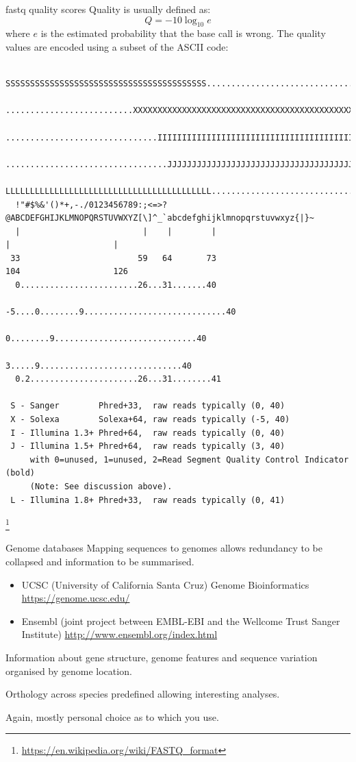 \documentclass[pdf]{beamer}
\newcommand\blfootnote[1]{%
  \begingroup  %
  \renewcommand\thefootnote{}\footnote{#1}%
  \addtocounter{footnote}{-1}  %
  \endgroup
}
\begin{document}
\begin{frame}[fragile]{fastq quality scores}
  Quality is usually defined as:
  $$
  Q = -10\log_{10}e
  $$
  where $e$ is the estimated probability that the base call is wrong.
  \pause
  The quality values are encoded using a subset of the ASCII code:
  {\tiny
\begin{verbatim}
  SSSSSSSSSSSSSSSSSSSSSSSSSSSSSSSSSSSSSSSSS.....................................................
  ..........................XXXXXXXXXXXXXXXXXXXXXXXXXXXXXXXXXXXXXXXXXXXXXX......................
  ...............................IIIIIIIIIIIIIIIIIIIIIIIIIIIIIIIIIIIIIIIII......................
  .................................JJJJJJJJJJJJJJJJJJJJJJJJJJJJJJJJJJJJJJJ......................
  LLLLLLLLLLLLLLLLLLLLLLLLLLLLLLLLLLLLLLLLLL....................................................
  !"#$%&'()*+,-./0123456789:;<=>?@ABCDEFGHIJKLMNOPQRSTUVWXYZ[\]^_`abcdefghijklmnopqrstuvwxyz{|}~
  |                         |    |        |                              |                     |
 33                        59   64       73                            104                   126
  0........................26...31.......40                                
                           -5....0........9.............................40 
                                 0........9.............................40 
                                    3.....9.............................40 
  0.2......................26...31........41                              

 S - Sanger        Phred+33,  raw reads typically (0, 40)
 X - Solexa        Solexa+64, raw reads typically (-5, 40)
 I - Illumina 1.3+ Phred+64,  raw reads typically (0, 40)
 J - Illumina 1.5+ Phred+64,  raw reads typically (3, 40)
     with 0=unused, 1=unused, 2=Read Segment Quality Control Indicator (bold) 
     (Note: See discussion above).
 L - Illumina 1.8+ Phred+33,  raw reads typically (0, 41)
\end{verbatim} }
    \blfootnote{\url{https://en.wikipedia.org/wiki/FASTQ_format}}
\end{frame}

\begin{frame}{Genome databases}
  Mapping sequences to genomes allows redundancy to be collapsed and information
  to be summarised.

  \begin{itemize}
    \item UCSC (University of California Santa Cruz) Genome Bioinformatics
      \url{https://genome.ucsc.edu/}
    \item Ensembl (joint project between EMBL-EBI and the Wellcome Trust Sanger Institute)
      \url{http://www.ensembl.org/index.html}
  \end{itemize}
  
  Information about gene structure, genome features and sequence variation organised
  by genome location.

  Orthology across species predefined allowing interesting analyses.

  Again, mostly personal choice as to which you use.
\end{frame}
\end{document}

